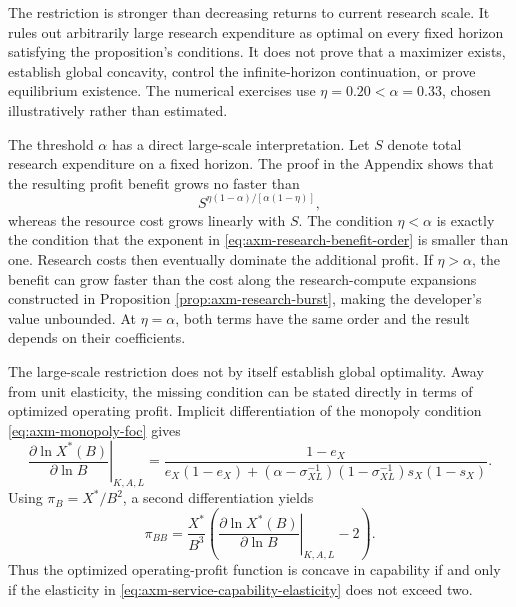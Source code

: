 The restriction is stronger than decreasing returns to current research scale.
It rules out arbitrarily large research expenditure as optimal on every fixed
horizon satisfying the proposition's conditions. It does not prove that a
maximizer exists, establish global concavity, control the infinite-horizon continuation,
or prove equilibrium existence. The numerical exercises use
\(\eta=0.20<\alpha=0.33\), chosen illustratively rather than estimated.

The threshold \(\alpha\) has a direct large-scale interpretation. Let \(S\)
denote total research expenditure on a fixed horizon. The proof in the Appendix
shows that the resulting profit benefit grows no faster than
\begin{equation}
 S^{\eta(1-\alpha)/[\alpha(1-\eta)]},
 \label{eq:axm-research-benefit-order}
\end{equation}
whereas the resource cost grows linearly with \(S\). The condition
\(\eta<\alpha\) is exactly the condition that the exponent in
\eqref{eq:axm-research-benefit-order} is smaller than one. Research costs then
eventually dominate the additional profit. If \(\eta>\alpha\), the benefit can
grow faster than the cost along the research-compute expansions constructed in
Proposition \ref{prop:axm-research-burst}, making the developer's value
unbounded. At \(\eta=\alpha\), both terms have the same order and the result
depends on their coefficients.

The large-scale restriction does not by itself establish global optimality.
Away from unit elasticity, the missing condition can be stated directly in
terms of optimized operating profit. Implicit differentiation of the monopoly
condition \eqref{eq:axm-monopoly-foc} gives
\begin{equation}
 \left.\frac{\partial\ln X^*(B)}{\partial\ln B}\right|_{K,A,L}
 =\frac{1-e_X}{
 e_X(1-e_X)
 +(\alpha-\sigma_{XL}^{-1})(1-\sigma_{XL}^{-1})s_X(1-s_X)}.
 \label{eq:axm-service-capability-elasticity}
\end{equation}
Using \(\pi_B=X^*/B^2\), a second differentiation yields
\begin{equation}
 \pi_{BB}=\frac{X^*}{B^3}
 \left(
 \left.\frac{\partial\ln X^*(B)}{\partial\ln B}\right|_{K,A,L}
 -2\right).
 \label{eq:axm-operating-profit-curvature}
\end{equation}
Thus the optimized operating-profit function is concave in capability if and
only if the elasticity in \eqref{eq:axm-service-capability-elasticity} does not
exceed two.

